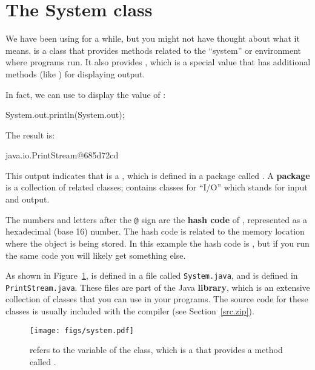 \section{The System class}


We have been using  for a while, but you might not have thought about what it means.
 is a class that provides methods related to the ``system'' or environment where programs run.
It also provides , which is a special value that has additional methods (like ) for displaying output.


In fact, we can use  to display the value of :

\begin{code}
System.out.println(System.out);
\end{code}

The result is:

\begin{stdout}
java.io.PrintStream@685d72cd
\end{stdout}


This output indicates that  is a , which is defined in a package called .
A {\bf package} is a collection of related classes;  contains classes for ``I/O'' which stands for input and output.


The numbers and letters after the {\tt @} sign are the {\bf hash code} of , represented as a hexadecimal (base 16) number.
The hash code is related to the memory location where the object is being stored.
In this example the hash code is , but if you run the same code you will likely get something else.


As shown in Figure~\ref{fig.system},  is defined in a file called {\tt System.java}, and  is defined in {\tt PrintStream.java}.
These files are part of the Java {\bf library}, which is an extensive collection of classes that you can use in your programs.
The source code for these classes is usually included with the compiler (see Section~\ref{src.zip}).

\begin{figure}[!ht]
\begin{center}
\texttt{[image: figs/system.pdf]}
\caption{ refers to the  variable of the  class, which is a  that provides a method called .}
\label{fig.system}
\end{center}
\end{figure}


